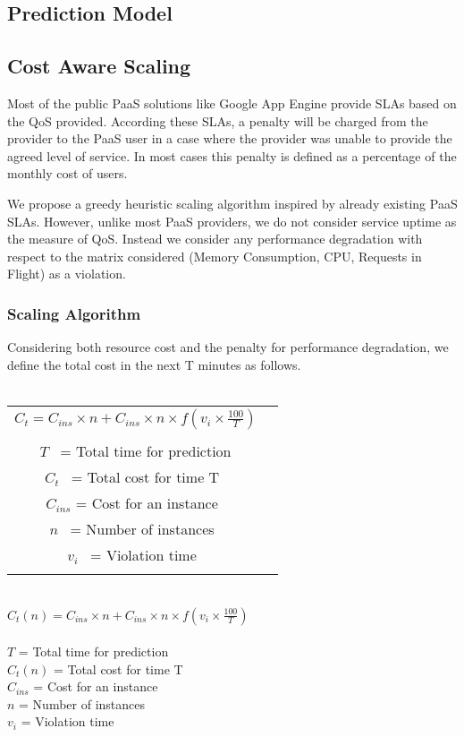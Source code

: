 \subsection{Prediction Model}

\subsection{Cost Aware Scaling}
Most of the public PaaS solutions like Google App Engine provide SLAs based on the QoS provided. According these SLAs, a penalty will be charged from the provider to the PaaS user in a case where the provider was unable to provide the agreed level of service. In most cases this penalty is defined as a percentage of the monthly cost of users.

We propose a greedy heuristic scaling algorithm inspired by already existing PaaS SLAs. However, unlike most PaaS providers, we do not consider service uptime as the measure of QoS. Instead we consider any performance degradation with respect to the matrix considered (Memory Consumption, CPU, Requests in Flight) as a violation.

\subsubsection{Scaling Algorithm}
Considering both resource cost and the penalty for performance degradation, we define the total cost in the next T minutes as follows.\\
\\
\begin{table} 
    \begin{tabular}{ c c }
        \textbf{$ C_t = C_{ins} \times n  +  C_{ins} \times n \times f(v_i \times \frac{100}{T}) $} \\\\$ T $  = Total time for prediction \\$ C_t $  = Total cost for time T  \\$ C_{ins} $ = Cost for an instance \\$ n $  = Number of instances  \\$ v_i $  = Violation time  \\ &  \\ 
    \end{tabular} 
\end{table}
\\
\textbf{$ C_t(n) = C_{ins} \times n  +  C_{ins} \times n \times f(v_i \times \frac{100}{T}) $} \\
\\
$T$       = Total time for prediction \\
$C_t(n) $ = Total cost for time T  \\
$C_{ins}$ = Cost for an instance   \\
$n$       = Number of instances  \\
$v_i$     = Violation time  \\

